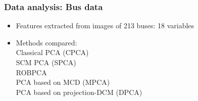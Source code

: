 \documentclass[handout,10pt]{beamer}
\begin{document}
\begin{frame}
\frametitle{Data analysis: Bus data}
\begin{itemize}
\item Features extracted from images of 213 buses: 18 variables
\vspace{.2cm}

\item Methods compared:\\
\vspace{.2cm}
Classical PCA (CPCA)\\
SCM PCA (SPCA)\\
ROBPCA \citep{hubert05}\\
PCA based on MCD (MPCA)\\
PCA based on projection-DCM (DPCA)
\vspace{.2cm}
\end{itemize}
\end{frame}
\end{document}
